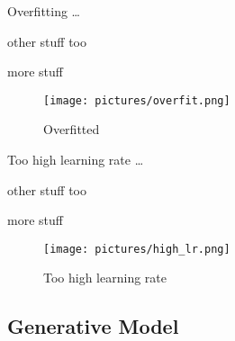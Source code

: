 Overfitting \dots

other stuff too

more stuff

\begin{figure}[H] %
\center
\texttt{[image: pictures/overfit.png]}
\caption{\label{fig:overfit}Overfitted}
\end{figure}

Too high learning rate \dots

other stuff too

more stuff

\begin{figure}[H]
\center
\texttt{[image: pictures/high\_lr.png]}
\caption{\label{fig:high_lr}Too high learning rate}
\end{figure}


\subsection{Generative Model} \label{GAN}







\begin{comment}

\LaTeX{} is great at great tool. Let $X_1, X_2, \ldots, X_n$ be a sequence of independent and identically distributed random variables with $\text{E}[X_i] = \mu$ and $\text{Var}[X_i] = \sigma^2 < \infty$, and let
\[S_n = \frac{X_1 + X_2 + \cdots + X_n}{n} = \frac{1}{n}\sum_{i}^{n} X_i\]
 $n$ approaches infinity, the random variables $\sqrt{n}(S_n - \mu)$ converge in distribution to a normal $\mathcal{N}(0, \sigma^2)$.

List of things \dots
\begin{enumerate}
\item Problems,
\item Structure data
\end{enumerate}
\dots More things \dots
\begin{itemize}
\item Things to add,
\item Testing
\end{itemize}

\end{comment}

